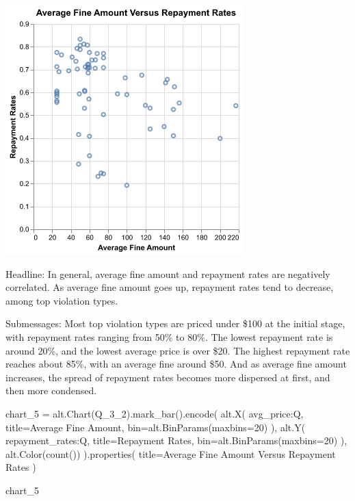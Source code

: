 \documentclass[
  letterpaper,
  DIV=11,
  numbers=noendperiod]{scrartcl}
\newenvironment{Shaded}{\begin{snugshade}}{\end{snugshade}}
\newcommand{\BuiltInTok}[1]{\textcolor[rgb]{0.00,0.23,0.31}{#1}}
\newcommand{\DecValTok}[1]{\textcolor[rgb]{0.68,0.00,0.00}{#1}}
\newcommand{\NormalTok}[1]{\textcolor[rgb]{0.00,0.23,0.31}{#1}}
\newcommand{\OperatorTok}[1]{\textcolor[rgb]{0.37,0.37,0.37}{#1}}
\newcommand{\StringTok}[1]{\textcolor[rgb]{0.13,0.47,0.30}{#1}}
\begin{document}
\includegraphics[width=3.61458in,height=3.79167in]{PS2 Answer_files/figure-pdf/cell-15-output-2.png}

Headline: In general, average fine amount and repayment rates are
negatively correlated. As average fine amount goes up, repayment rates
tend to decrease, among top violation types.

Submessages: Most top violation types are priced under \$100 at the
initial stage, with repayment rates ranging from 50\% to 80\%. The
lowest repayment rate is around 20\%, and the lowest average price is
over \$20. The highest repayment rate reaches about 85\%, with an
average fine around \$50. And as average fine amount increases, the
spread of repayment rates becomes more dispersed at first, and then more
condensed.

\begin{Shaded}
\begin{Highlighting}[]
\NormalTok{chart\_5 }\OperatorTok{=}\NormalTok{ alt.Chart(Q\_3\_2).mark\_bar().encode(}
\NormalTok{    alt.X(}
        \StringTok{\textquotesingle{}avg\_price:Q\textquotesingle{}}\NormalTok{, }
\NormalTok{        title}\OperatorTok{=}\StringTok{\textquotesingle{}Average Fine Amount\textquotesingle{}}\NormalTok{, }
        \BuiltInTok{bin}\OperatorTok{=}\NormalTok{alt.BinParams(maxbins}\OperatorTok{=}\DecValTok{20}\NormalTok{)}
\NormalTok{        ),}
\NormalTok{    alt.Y(}
        \StringTok{\textquotesingle{}repayment\_rates:Q\textquotesingle{}}\NormalTok{, }
\NormalTok{        title}\OperatorTok{=}\StringTok{\textquotesingle{}Repayment Rates\textquotesingle{}}\NormalTok{, }
        \BuiltInTok{bin}\OperatorTok{=}\NormalTok{alt.BinParams(maxbins}\OperatorTok{=}\DecValTok{20}\NormalTok{)}
\NormalTok{        ),}
\NormalTok{    alt.Color(}\StringTok{\textquotesingle{}count()\textquotesingle{}}\NormalTok{)}
\NormalTok{).properties(}
\NormalTok{    title}\OperatorTok{=}\StringTok{\textquotesingle{}Average Fine Amount Versus Repayment Rates\textquotesingle{}}
\NormalTok{)}

\NormalTok{chart\_5}
\end{Highlighting}
\end{Shaded}
\end{document}
